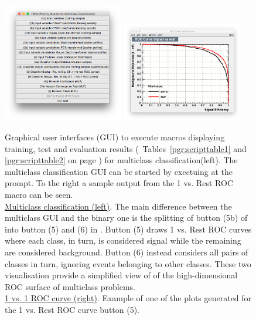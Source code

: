 \begin{figure}[h]
  \begin{center}
     \includegraphics[width=0.47\textwidth]{plots/multiclass/TMVAMulticlassGui}\hspace{0.3cm}
     \includegraphics[width=0.47\textwidth]{plots/multiclass/TMVAMulticlassRoc1vsAll}
  \end{center}
  \vspace{-0.1cm}
  \caption[.]{Graphical user interfaces (GUI) to execute macros displaying training, test and evaluation results (\cf\  Tables~\ref{pgr:scripttable1} and \ref{pgr:scripttable2} on page \pageref{pgr:scripttable1}) for multiclass classification(left). The multiclass classification GUI can be started by exectuing  at the prompt.
  To the right a sample output from the 1 vs. Rest ROC macro can be seen.
  {\footnotesize
     \\
     \underline{Multiclass classification (left)}. The main difference between the multiclass GUI and the binary one is the splitting of button (5b) of  into button (5) and (6) in .
     Button (5) draws 1 vs. Rest ROC curves where each class, in turn, is considered signal while the remaining are considered background.
     Button (6) instead considers all pairs of classes in turn, ignoring events belonging to other classes.
     These two visualisation provide a simplified view of of the high-dimensional ROC surface of multiclass problems.
     \\
     \underline{1 vs. 1 ROC curve (right)}. Example of one of the plots generated for the 1 vs. Rest ROC curve button (5).
  }
  }
\label{fig:tmva:multiclass:gui}
\end{figure}

